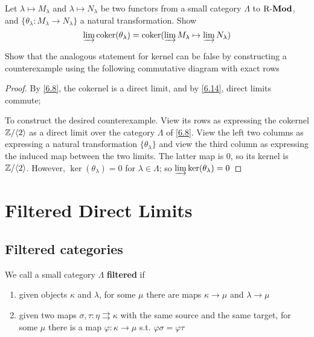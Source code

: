 \documentclass[11pt]{article}
\begin{document}
\begin{exercise}
\label{6.17}
Let \(\lambda\mapsto M_\lambda\) and \(\lambda\mapsto N_\lambda\) be two
functors from a small category \(\Lambda\) to \(\operatorname{R-\textbf{Mod}}\), and
\(\{\theta_\lambda:M_\lambda\to N_\lambda\}\) a natural transformation. Show
\begin{equation*}
\varinjlim\operatorname{coker}(\theta_\lambda)=\operatorname{coker}(\varinjlim M_\lambda\mapsto\varinjlim N_\lambda)
\end{equation*}

Show that the analogous statement for kernel can be false by constructing a
counterexample using the following commutative diagram with exact rows
\begin{center}
\end{center}
\end{exercise}
\begin{proof}
By \ref{6.8}, the cokernel is a direct limit, and by \ref{6.14},  direct limits
commute;

To construct the desired counterexample. View its rows as expressing the
cokernel \(\mathbb{Z}/\langle2\rangle\) as a direct limit over the category \(\Lambda\) of \ref{6.8}.
View the left two columns as expressing a natural transformation
\(\{\theta_\lambda\}\) and view the third column as expressing the induced
map between the two limits. The latter map is 0, so its kernel is
\(\mathbb{Z}/\langle2\rangle\). However, \(\ker(\theta_\lambda)=0\) for
\(\lambda\in\Lambda\); so \(\varinjlim\ker(\theta_\lambda)=0\)
\end{proof}
\section{Filtered Direct Limits}
\label{sec:org39e0269}
\subsection*{Filtered categories}
\label{sec:org4118ea3}
We call a small category \(\Lambda\) \textbf{filtered} if
\begin{enumerate}
\item given objects \(\kappa\) and \(\lambda\), for some \(\mu\) there are maps \(\kappa\to\mu\) and \(\lambda\to\mu\)
\item given two maps \(\sigma,\tau:\eta\rightrightarrows  \kappa\) with the same source and
the same target, for some \(\mu\) there is a map \(\varphi:\kappa\to\mu\) s.t. \(\varphi\sigma=\varphi\tau\)
\end{enumerate}
\end{document}
